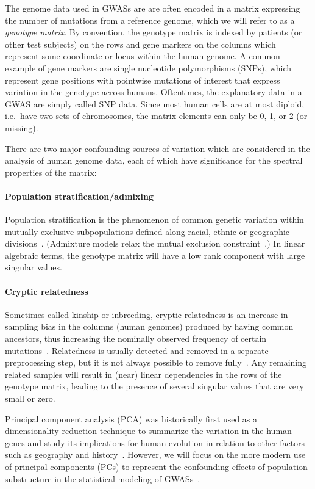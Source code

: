 \documentclass[review]{siamart0516}
\begin{document}
The genome data used in
GWASs are are often encoded in a matrix expressing the number of mutations
from a reference genome, which we will refer to as a \textit{genotype matrix}.
By convention, the genotype matrix is indexed by patients (or other test
subjects) on the rows and gene markers on the columns which represent some
coordinate or locus within the human genome. A common example of gene markers are
single nucleotide polymorphisms (SNPs), which represent gene positions with
pointwise mutations of interest that express variation in the genotype across
humans. Oftentimes, the explanatory data in a GWAS are simply called SNP data.
Since most human cells are at most diploid, i.e.\ have two sets of chromosomes,
the matrix elements can only be 0, 1, or 2 (or missing).

There are two major confounding sources of variation which are considered in
the analysis of human genome data, each of which have significance for the
spectral properties of the matrix:

\paragraph{Population stratification/admixing}
Population stratification is the phenomenon of common genetic variation within
mutually exclusive subpopulations defined along racial, ethnic or geographic
divisions~\cite{Pritchard1999,Cardon2003}. (Admixture models relax the mutual
exclusion constraint~\cite{Devlin1999,Sankararaman2008}.)
In linear algebraic terms, the genotype matrix will have a low rank component
with large singular values.

\paragraph{Cryptic relatedness}
Sometimes called kinship or inbreeding, cryptic relatedness is an increase in
sampling bias in the columns (human genomes) produced by having common ancestors,
thus increasing the nominally observed frequency of certain
mutations~\cite{Voight2005,Astle2009}. Relatedness is usually detected and removed in
a separate preprocessing step, but it is not always possible to remove
fully~\cite{PLINK}. Any remaining related samples will
result in (near) linear dependencies in the rows of the genotype matrix,
leading to the presence of several singular values that are very small or zero.

Principal component analysis (PCA) was historically first used as a dimensionality
reduction technique to summarize the variation in the human genes and study its
implications for human evolution in relation to other factors such as
geography and history~\cite{Menozzi1978,Cavalli1994,Novembre2008}.
However, we will focus on the more modern use of principal components (PCs) to
represent the confounding effects of population substructure in the statistical
modeling of GWASs~\cite{Chen2003,Patterson2006,Price2006,Zhu2002,Zhang2003}.
\end{document}
